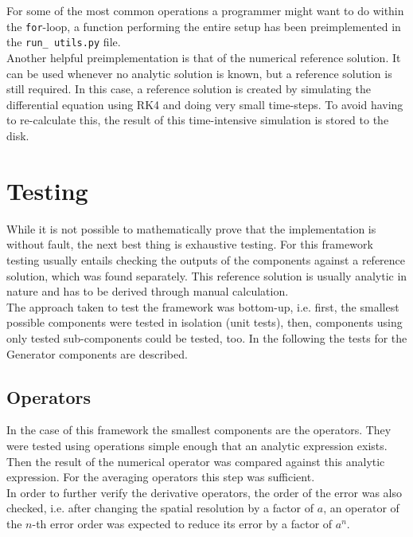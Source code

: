 \\\\
For some of the most common operations a programmer might want to do within the \texttt{for}-loop, a function performing the entire setup has been preimplemented in the \texttt{run\_ utils.py} file.
\\
Another helpful preimplementation is that of the numerical reference solution.
It can be used whenever no analytic solution is known, but a reference solution is still required.
In this case, a reference solution is created by simulating the differential equation using RK4 and doing very small time-steps.
To avoid having to re-calculate this, the result of this time-intensive simulation is stored to the disk.

\section{Testing}\label{sec:testing}
While it is not possible to mathematically prove that the implementation is without fault, the next best thing is exhaustive testing.
For this framework testing usually entails checking the outputs of the components against a reference solution, which was found separately.
This reference solution is usually analytic in nature and has to be derived through manual calculation.
\\
The approach taken to test the framework was bottom-up, i.e. first, the smallest possible components were tested in isolation (unit tests), then, components using only tested sub-components could be tested, too.
In the following the tests for the Generator components are described.

\subsection{Operators}
In the case of this framework the smallest components are the operators.
They were tested using operations simple enough that an analytic expression exists.
Then the result of the numerical operator was compared against this analytic expression.
For the averaging operators this step was sufficient.
\\
In order to further verify the derivative operators, the order of the error was also checked, i.e. after changing the spatial resolution by a factor of $a$, an operator of the $n$-th error order was expected to reduce its error by a factor of $a^n$.

